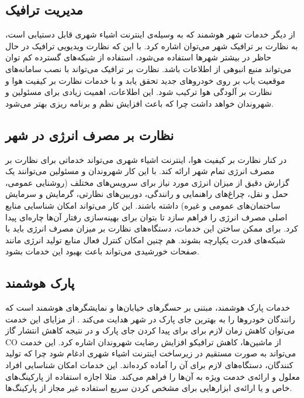     \subsection{مدیریت ترافیک}
      از دیگر خدمات شهر هوشمند که به وسیله‌ی اینترنت اشیاء شهری قابل دستیابی است، به نظارت بر ترافیک شهر می‌توان اشاره کرد.
      با این که نظارت ویدیویی ترافیک در حال حاظر در بیشتر شهر‌ها استفاده می‌شود، استفاده از شبکه‌های گسترده کم توان می‌تواند منبع انبوهی از اطلاعات باشد.
      نظارت بر ترافیک می‌تواند با نصب سامانه‌های موقعیت یاب بر روی خودرو‌های جدید تحقق یابد \cite{li2008performance} و با خدمات نظارت بر کیفیت هوا و نظارت بر آلودگی هوا ترکیب شود.
      این اطلاعات، اهمیت زیادی برای مسئولین و شهروندان خواهد داشت چرا که باعث افزایش نظم و برنامه ریزی بهتر می‌شود.

    \subsection{نظارت بر مصرف انرژی در شهر}
      در کنار نظارت بر کیفیت هوا، اینترنت اشیاء شهری می‌تواند خدماتی برای نظارت بر مصرف انرژی تمام شهر ارائه کند.
      با این کار شهروندان و مسئولین می‌توانند یک گزارش دقیق از میزان انرژی مورد نیاز برای سرویس‌های مختلف (روشنایی عمومی، حمل و نقل، چراغ‌های راهنمایی و رانندگی، دوربین‌های نظارتی، گرمایش و سرمایش ساختمان‌های عمومی و غیره) داشته باشند.
      این کار می‌تواند امکان شناسایی منابع اصلی مصرف انرژی را فراهم سازد تا بتوان برای بهینه‌سازی رفتار آن‌ها چاره‌ای پیدا کرد.
      برای ممکن ساختن این خدمات، دستگاه‌های نظارت بر میزان مصرف انرژی باید با شبکه‌های قدرت یکپارچه بشوند.
      هم چنین امکان کنترل فعال منابع تولید انرژی مانند صفحات خورشیدی می‌تواند باعث بهبود این خدمات بشود.

    \subsection{پارک هوشمند}
      خدمات پارک هوشمند، مبتنی بر حسگر‌های خیابان‌ها و نمایشگر‌های هوشمند است که رانندگان خودرو‌ها را به بهترین جای پارک در شهر هدایت می‌کند \cite{lee2008intelligent}.
      از مزایای این خدمت می‌توان کاهش زمان لازم برای برای پیدا کردن جای پارک و در نتیجه کاهش انتشار گاز CO از ماشین‌ها، کاهش ترافیکو افزایش رضایت شهروندان اشاره کرد.
      این خدمت می‌تواند به صورت مستقیم در زیرساخت اینترنت اشیاء شهری ادغام شود چرا که تولید کنندگان، دستگاه‌های لازم برای آن را آماده کرده‌اند.
      این خدمات امکان شناسایی افراد معلول و ارائه‌ی خدمت ویژه به آن‌ها را فراهم می‌کند.
      مثلا اجازه استفاده از پارکینگ‌های خاص و یا ارائه‌ی ابزار‌هایی برای مشخص کردن سریع استفاده غیر مجاز از پارکینگ‌ها.

